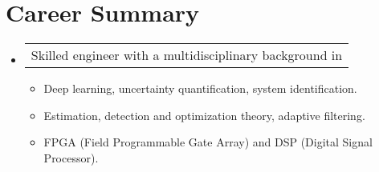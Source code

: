 \section{Career Summary}

\begin{itemize}[leftmargin=0.15in, label={}] %
    \item   \begin{tabular*}{0.2\textwidth}{l} Skilled engineer with a multidisciplinary background in \end{tabular*}\vspace{-7pt} %
            \begin{itemize} %
                \item{Deep learning, uncertainty quantification, system identification. \vspace{-2pt}} %
                \item{Estimation, detection and optimization theory, adaptive filtering. \vspace{-2pt}} %
                \item{FPGA (Field Programmable Gate Array) and DSP (Digital Signal Processor). \vspace{-2pt}} %
            \end{itemize}\vspace{-5pt}
\end{itemize} %
